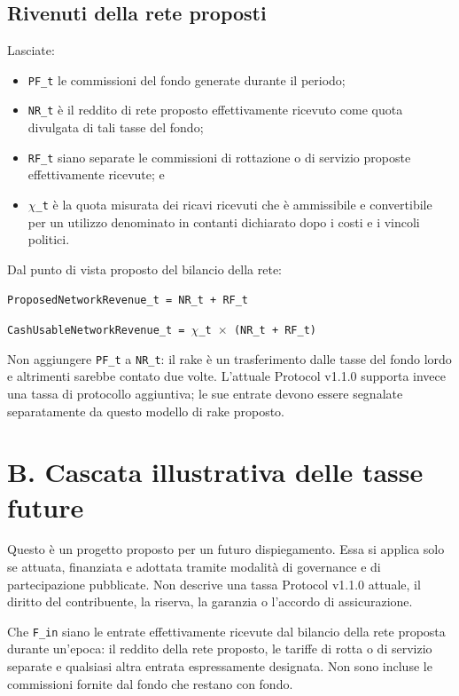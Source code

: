 \documentclass[11pt]{article}
\begin{document}
\subsection*{Rivenuti della rete proposti}

Lasciate:

\begin{itemize}[leftmargin=*]
\item \texttt{PF\_t} le commissioni del fondo generate durante il periodo;
\item \texttt{NR\_t} è il reddito di rete proposto effettivamente ricevuto come quota divulgata di tali tasse del fondo;
\item \texttt{RF\_t} siano separate le commissioni di rottazione o di servizio proposte effettivamente ricevute; e
\item \texttt{$\chi$\_t} è la quota misurata dei ricavi ricevuti che è ammissibile e convertibile per un utilizzo denominato in contanti dichiarato dopo i costi e i vincoli politici.
\end{itemize}
Dal punto di vista proposto del bilancio della rete:

\texttt{ProposedNetworkRevenue\_t = NR\_t + RF\_t}

\texttt{CashUsableNetworkRevenue\_t = $\chi$\_t $\times$ (NR\_t + RF\_t)}

Non aggiungere \texttt{PF\_t} a \texttt{NR\_t}: il rake è un trasferimento dalle tasse del fondo lordo e altrimenti sarebbe contato due volte. L'attuale Protocol v1.1.0 supporta invece una tassa di protocollo aggiuntiva; le sue entrate devono essere segnalate separatamente da questo modello di rake proposto.


\section*{B. Cascata illustrativa delle tasse future}

Questo è un progetto proposto per un futuro dispiegamento. Essa si applica solo se attuata, finanziata e adottata tramite modalità di governance e di partecipazione pubblicate. Non descrive una tassa Protocol v1.1.0 attuale, il diritto del contribuente, la riserva, la garanzia o l'accordo di assicurazione.

Che \texttt{F\_in} siano le entrate effettivamente ricevute dal bilancio della rete proposta durante un'epoca: il reddito della rete proposto, le tariffe di rotta o di servizio separate e qualsiasi altra entrata espressamente designata. Non sono incluse le commissioni fornite dal fondo che restano con fondo.
\end{document}

